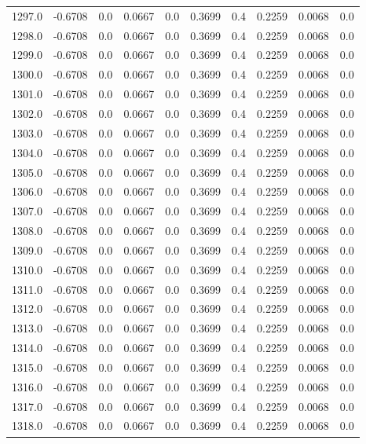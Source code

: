 \begin{longtable}{lrrrrrrrrr}
1297.0 & -0.6708 & 0.0 & 0.0667 & 0.0 & 0.3699 & 0.4 & 0.2259 & 0.0068 & 0.0 \\
1298.0 & -0.6708 & 0.0 & 0.0667 & 0.0 & 0.3699 & 0.4 & 0.2259 & 0.0068 & 0.0 \\
1299.0 & -0.6708 & 0.0 & 0.0667 & 0.0 & 0.3699 & 0.4 & 0.2259 & 0.0068 & 0.0 \\
1300.0 & -0.6708 & 0.0 & 0.0667 & 0.0 & 0.3699 & 0.4 & 0.2259 & 0.0068 & 0.0 \\
1301.0 & -0.6708 & 0.0 & 0.0667 & 0.0 & 0.3699 & 0.4 & 0.2259 & 0.0068 & 0.0 \\
1302.0 & -0.6708 & 0.0 & 0.0667 & 0.0 & 0.3699 & 0.4 & 0.2259 & 0.0068 & 0.0 \\
1303.0 & -0.6708 & 0.0 & 0.0667 & 0.0 & 0.3699 & 0.4 & 0.2259 & 0.0068 & 0.0 \\
1304.0 & -0.6708 & 0.0 & 0.0667 & 0.0 & 0.3699 & 0.4 & 0.2259 & 0.0068 & 0.0 \\
1305.0 & -0.6708 & 0.0 & 0.0667 & 0.0 & 0.3699 & 0.4 & 0.2259 & 0.0068 & 0.0 \\
1306.0 & -0.6708 & 0.0 & 0.0667 & 0.0 & 0.3699 & 0.4 & 0.2259 & 0.0068 & 0.0 \\
1307.0 & -0.6708 & 0.0 & 0.0667 & 0.0 & 0.3699 & 0.4 & 0.2259 & 0.0068 & 0.0 \\
1308.0 & -0.6708 & 0.0 & 0.0667 & 0.0 & 0.3699 & 0.4 & 0.2259 & 0.0068 & 0.0 \\
1309.0 & -0.6708 & 0.0 & 0.0667 & 0.0 & 0.3699 & 0.4 & 0.2259 & 0.0068 & 0.0 \\
1310.0 & -0.6708 & 0.0 & 0.0667 & 0.0 & 0.3699 & 0.4 & 0.2259 & 0.0068 & 0.0 \\
1311.0 & -0.6708 & 0.0 & 0.0667 & 0.0 & 0.3699 & 0.4 & 0.2259 & 0.0068 & 0.0 \\
1312.0 & -0.6708 & 0.0 & 0.0667 & 0.0 & 0.3699 & 0.4 & 0.2259 & 0.0068 & 0.0 \\
1313.0 & -0.6708 & 0.0 & 0.0667 & 0.0 & 0.3699 & 0.4 & 0.2259 & 0.0068 & 0.0 \\
1314.0 & -0.6708 & 0.0 & 0.0667 & 0.0 & 0.3699 & 0.4 & 0.2259 & 0.0068 & 0.0 \\
1315.0 & -0.6708 & 0.0 & 0.0667 & 0.0 & 0.3699 & 0.4 & 0.2259 & 0.0068 & 0.0 \\
1316.0 & -0.6708 & 0.0 & 0.0667 & 0.0 & 0.3699 & 0.4 & 0.2259 & 0.0068 & 0.0 \\
1317.0 & -0.6708 & 0.0 & 0.0667 & 0.0 & 0.3699 & 0.4 & 0.2259 & 0.0068 & 0.0 \\
1318.0 & -0.6708 & 0.0 & 0.0667 & 0.0 & 0.3699 & 0.4 & 0.2259 & 0.0068 & 0.0 \\

\end{longtable}
